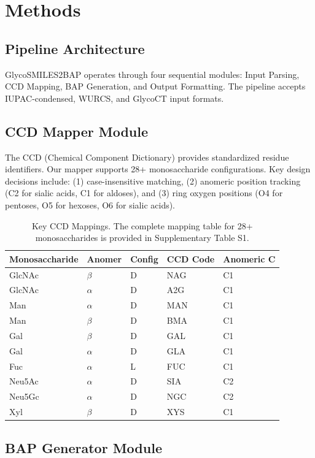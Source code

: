 \section{Methods}

\subsection{Pipeline Architecture}

GlycoSMILES2BAP operates through four sequential modules: Input Parsing, CCD Mapping, BAP Generation, and Output Formatting. The pipeline accepts IUPAC-condensed, WURCS, and GlycoCT input formats.

\subsection{CCD Mapper Module}

The CCD (Chemical Component Dictionary) provides standardized residue identifiers. Our mapper supports 28+ monosaccharide configurations. Key design decisions include: (1) case-insensitive matching, (2) anomeric position tracking (C2 for sialic acids, C1 for aldoses), and (3) ring oxygen positions (O4 for pentoses, O5 for hexoses, O6 for sialic acids).

\begin{table}[h]
\centering
\caption{Key CCD Mappings. The complete mapping table for 28+ monosaccharides is provided in Supplementary Table S1.}
\begin{tabular}{lllll}
\toprule
Monosaccharide & Anomer & Config & CCD Code & Anomeric C \\
\midrule
GlcNAc & $\beta$ & D & NAG & C1 \\
GlcNAc & $\alpha$ & D & A2G & C1 \\
Man & $\alpha$ & D & MAN & C1 \\
Man & $\beta$ & D & BMA & C1 \\
Gal & $\beta$ & D & GAL & C1 \\
Gal & $\alpha$ & D & GLA & C1 \\
Fuc & $\alpha$ & L & FUC & C1 \\
Neu5Ac & $\alpha$ & D & SIA & C2 \\
Neu5Gc & $\alpha$ & D & NGC & C2 \\
Xyl & $\beta$ & D & XYS & C1 \\
\bottomrule
\end{tabular}
\end{table}

\subsection{BAP Generator Module}

